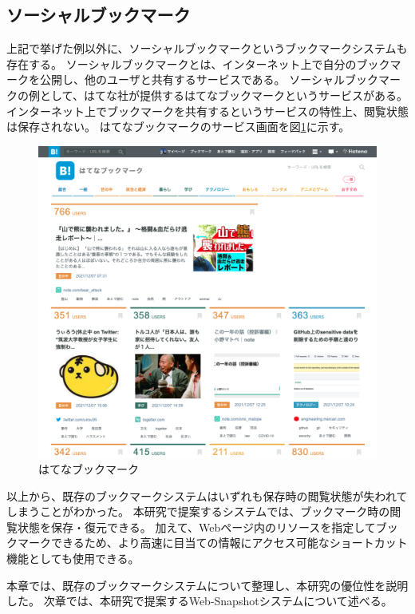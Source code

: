 \subsection{ソーシャルブックマーク}
上記で挙げた例以外に、ソーシャルブックマークというブックマークシステムも存在する。
ソーシャルブックマークとは、インターネット上で自分のブックマークを公開し、他のユーザと共有するサービスである。
ソーシャルブックマークの例として、はてな社\cite{hatena}が提供するはてなブックマーク\cite{hatena-bookmark}というサービスがある。
インターネット上でブックマークを共有するというサービスの特性上、閲覧状態は保存されない。
はてなブックマークのサービス画面を図\ref{fig:hatena-bookmark}に示す。

\begin{figure}[htbp]
  \label{fig:hatena-bookmark}
  \begin{center}
    \includegraphics[bb=0 0 1020 940,width=15cm]{img/020_related_works/hatena-bookmark.pdf}
  \end{center}
  \caption{はてなブックマーク}
\end{figure}

以上から、既存のブックマークシステムはいずれも保存時の閲覧状態が失われてしまうことがわかった。
本研究で提案するシステムでは、ブックマーク時の閲覧状態を保存・復元できる。
加えて、Webページ内のリソースを指定してブックマークできるため、より高速に目当ての情報にアクセス可能なショートカット機能としても使用できる。

本章では、既存のブックマークシステムについて整理し、本研究の優位性を説明した。
次章では、本研究で提案するWeb-Snapshotシステムについて述べる。
